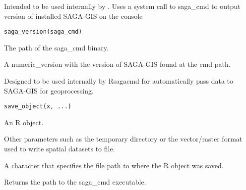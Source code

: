 \documentclass[a4paper]{book}
\begin{document}
%
\begin{Description}
Intended to be used internally by . Uses a system call
to saga\_cmd to output version of installed SAGA-GIS on the console
\end{Description}
%
\begin{Usage}
\begin{verbatim}
saga_version(saga_cmd)
\end{verbatim}
\end{Usage}
%
\begin{Arguments}
\begin{ldescription}
\item[\code{saga\_cmd}] The path of the saga\_cmd binary.
\end{ldescription}
\end{Arguments}
%
\begin{Value}
A numeric\_version with the version of SAGA-GIS found at the cmd path.
\end{Value}
%
\begin{Description}
Designed to be used internally by Rsagacmd for automatically pass data to
SAGA-GIS for geoprocessing.
\end{Description}
%
\begin{Usage}
\begin{verbatim}
save_object(x, ...)
\end{verbatim}
\end{Usage}
%
\begin{Arguments}
\begin{ldescription}
\item[\code{x}] An R object.

\item[\code{...}] Other parameters such as the temporary directory or the
vector/raster format used to write spatial datasets to file.
\end{ldescription}
\end{Arguments}
%
\begin{Value}
A character that specifies the file path to where the R object was
saved.
\end{Value}
%
\begin{Description}
Returns the path to the saga\_cmd executable.
\end{Description}
\end{document}
